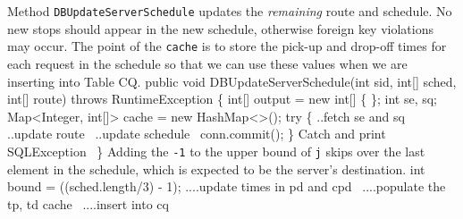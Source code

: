 \documentclass{article}
\def\nwendcode{\endtrivlist \endgroup}
\let\nwdocspar=\par
\theoremstyle{definition}
\begin{document}
Method {\tt{}\protect{}DBUpdateServerSchedule} updates the \emph{remaining} route and
schedule.  No new stops should appear in the new schedule, otherwise foreign
key violations may occur. The point of the {\tt{}cache} is to store the
pick-up and drop-off times for each request in the schedule so that we
can use these values when we are inserting into Table CQ.
\nwenddocs{}\endmoddef{}
public void DBUpdateServerSchedule(int sid, int[] sched, int[] route)
throws RuntimeException \{
  int[] output = new int[] \{ \};
  int se, sq;
  Map<Integer, int[]> cache = new HashMap<>();
  try \{
    \LA{}..fetch \code{}se\edoc{} and \code{}sq\edoc{}~{\nwtagstyle{}}\RA{}
    \LA{}..update route~{\nwtagstyle{}}\RA{}
    \LA{}..update schedule~{\nwtagstyle{}}\RA{}
    conn.commit();
  \}
  \LA{}Catch and print \code{}SQLException\edoc{}~{\nwtagstyle{}}\RA{}
\}
\eatline
{}\nwendcode{}Adding the {\tt{}-1} to the upper bound of {\tt{}j} skips over the last element
in the schedule, which is expected to be the server's destination.
\nwenddocs{}\endmoddef{}
int bound = ((sched.length/3) - 1);
\LA{}....update times in pd and cpd~{\nwtagstyle{}}\RA{}
\LA{}....populate the tp, td cache~{\nwtagstyle{}}\RA{}
\LA{}....insert into cq~{\nwtagstyle{}}\RA{}
\nwendcode{}\nwdocspar
\nwenddocs{}\endmoddef{}
\end{document}
